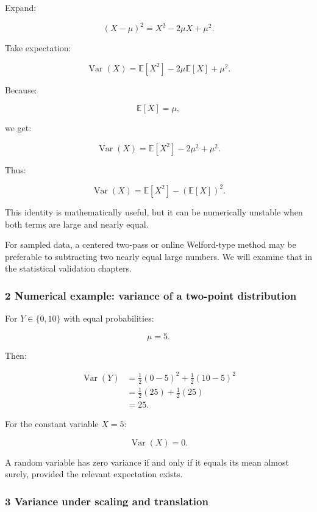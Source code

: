 \hypertarget{02-foundations-ii-ch023-deriving-the-computational-formula}{}

Expand:

\[
 (X-\mu)^2=X^2-2\mu X+\mu^2.
\]

Take expectation:

\[
 \operatorname{Var}(X) = \mathbb E[X^2] -2\mu\mathbb E[X] +\mu^2.
\]

Because:

\[
 \mathbb E[X]=\mu,
\]

we get:

\[
 \operatorname{Var}(X) = \mathbb E[X^2]-2\mu^2+\mu^2.
\]

Thus:

\[
 \boxed{ \operatorname{Var}(X)= \mathbb E[X^2]-(\mathbb E[X])^2 }.
\]

This identity is mathematically useful, but it can be numerically unstable when both terms are large and nearly equal.

For sampled data, a centered two-pass or online Welford-type method may be preferable to subtracting two nearly equal large numbers. We will examine that in the statistical validation chapters.

\subsubsection{2 Numerical example: variance of a two-point distribution}\label{02-foundations-ii-ch023-numerical-example-variance-of-a-two-point-distribution}

\hypertarget{02-foundations-ii-ch023-numerical-example-variance-of-a-two-point-distribution}{}

For \(Y\in\{0,10\}\) with equal probabilities:

\[
 \mu=5.
\]

Then:

\[
 \begin{aligned} \operatorname{Var}(Y) &=\frac12(0-5)^2+\frac12(10-5)^2\\ &=\frac12(25)+\frac12(25)\\ &=\boxed{25}. \end{aligned}
\]

For the constant variable \(X=5\):

\[
 \operatorname{Var}(X)=0.
\]

A random variable has zero variance if and only if it equals its mean almost surely, provided the relevant expectation exists.

\subsubsection{3 Variance under scaling and translation}\label{02-foundations-ii-ch023-variance-under-scaling-and-translation}

